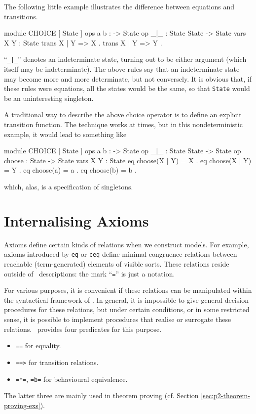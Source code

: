\documentclass[a4paper]{memoir}
\begin{document}
The following little example illustrates the difference between equations
and transitions.\label{exs:choice}
\begin{vvtm}
\begin{ccode}
  module CHOICE {
    [ State ]
    ops a b : -> State
    op _|_  : State State -> State
    vars X Y : State
    trans X | Y => X .
    trans X | Y => Y .
  }
\end{ccode}
\end{vvtm}
``\verb+_|_+'' denotes an indeterminate state, turning out to be either
argument (which itself may be indeterminate). The above rules
say that an indeterminate state may become more and more
determinate, but not conversely. It is obvious that,
if these rules were equations, all the states would be the same, so
that \verb|State| would be an uninteresting singleton.

A traditional way to describe the above choice operator is to
define an explicit transition function. The technique works at times,
but in this nondeterministic example, it would lead to something like
\begin{vvtm}
\begin{ccode}
  module CHOICE {
    [ State ]
    ops a b : -> State
    op _|_  : State State -> State
    op choose : State -> State
    vars X Y : State
    eq choose(X | Y) = X .
    eq choose(X | Y) = Y .
    eq choose(a) = a .
    eq choose(b) = b .
  }
\end{ccode}
\end{vvtm}
which, alas, is a specification of singletons.

\section{Internalising Axioms}\label{sec:p2-internal-axioms}

Axioms define certain kinds of relations when we construct models.
For example, axioms introduced by \verb|eq| or \verb|ceq| define
minimal congruence relations between reachable (term-generated)
elements of visible sorts. These relations reside outside of \cafeobj
~descriptions:
the mark ``\verb|=|'' is just a notation.

For various purposes, it is convenient if these relations can be
manipulated within the syntactical framework of \cafeobj. In general,
it is impossible to give general decision procedures for these
relations, but under certain conditions, or in some restricted
sense, it is possible to implement procedures that realise or
surrogate these relations. \cafeobj~provides four predicates
for this purpose.
\begin{itemize}
\item \verb|==| for equality.
\item \verb|==>| for transition relations.
\item \verb|=*=|, \verb|=b=| for behavioural equivalence.
\end{itemize}
The latter three are mainly used in theorem proving
(cf. Section \ref{sec:p2-theorem-proving-exs}).
\end{document}
